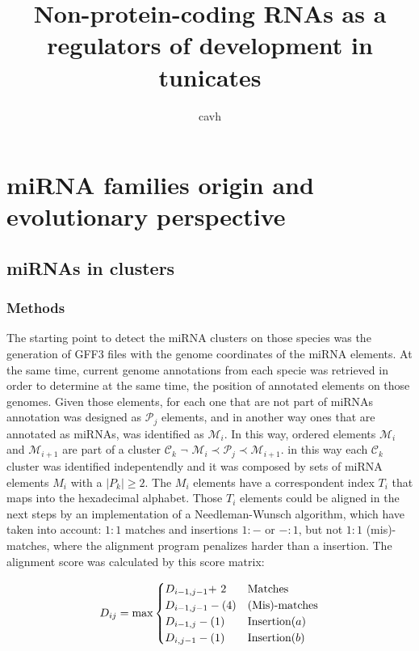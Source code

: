 \documentclass[11pt]{article}
\title{Non-protein-coding RNAs as a regulators of development in tunicates}
\author{cavh}
\begin{document}
\maketitle


\section*{miRNA families origin and evolutionary perspective}
\subsection*{miRNAs in clusters}

\subsubsection*{Methods}
The starting point to detect the miRNA clusters on those species was the generation of GFF3 files with the genome coordinates of the miRNA elements. At the same time, current genome annotations from each specie was retrieved in order to determine at the same time, the position of annotated elements on those genomes. Given those elements, for each one that are not part of miRNAs annotation was designed as $\mathcal{P}_{j}$ elements, and in another way ones that are annotated as miRNAs, was identified as $\mathcal{M}_{i}$. In this way, ordered elements $\mathcal{M}_i$ and $\mathcal{M}_{i+1}$ are part of a cluster $\mathcal{C}_{k}$  $ \neg $ $\mathcal{M}_{i} \prec \mathcal{P}_{j} \prec \mathcal{M}_{i+1} $. in this way each $\mathcal{C}_{k}$ cluster was identified indepentendly and it was composed by sets of miRNA elements $M_{i}$ with a $\left\vert{P}_{k}\right\vert \ge 2$. The $M_{i}$ elements have a correspondent index $T_{i}$ that maps into the hexadecimal alphabet. Those $T_{i}$ elements could be aligned in the next steps by an implementation of a Needleman-Wunsch \cite{Needleman:70} algorithm, which have taken into account: $1:1$ matches and insertions $1:-$ or $-:1$, but not $1:1$ (mis)-matches, where the alignment program penalizes harder than a insertion. The alignment score was calculated by this score matrix:

\begin{equation}
  D_{ij} = \max \begin{cases} 
      D_{i-1,j-1}  $+ 2$ &  \textrm{Matches} \\
      D_{i-1,j-1} - ($4$) &  \textrm{(Mis)-matches} \\ 
      D_{i-1,j}   - ($1$) &  \textrm{Insertion}(a)\\
      D_{i,j-1}   - ($1$) &  \textrm{Insertion}(b)\\
      \end{cases} 
\end{equation}
\end{document}
